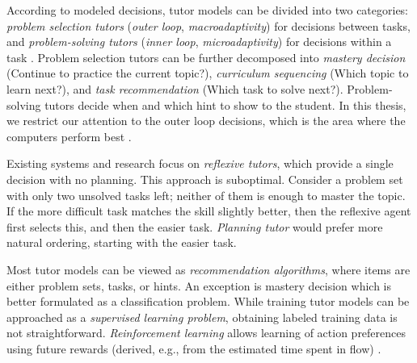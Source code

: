 According to modeled decisions, tutor models can be divided into two categories:
\emph{problem selection tutors} (\emph{outer loop}, \emph{macroadaptivity})
for decisions between tasks, %
and \emph{problem-solving tutors} (\emph{inner loop}, \emph{microadaptivity})
for decisions within a task \cite{its-learner-models}. %
Problem selection tutors can be further decomposed %
into
\emph{mastery decision} (Continue to practice the current topic?),
\emph{curriculum sequencing} (Which topic to learn next?),
and \emph{task recommendation} (Which task to solve next?).
Problem-solving tutors decide when and which hint to show to the student.
In this thesis, we restrict our attention to the outer loop decisions,
which is the area where the computers perform best \cite{als-future}.

Existing systems and research focus on \emph{reflexive tutors}, which
provide a single decision with no planning. %
This approach is suboptimal. Consider a problem set with only two
unsolved tasks left; neither of them is enough to master the topic.
If the more difficult task matches the skill slightly better, then
the reflexive agent first selects this, and then the easier task.
\emph{Planning tutor} would prefer more natural ordering,
starting with the easier task.

Most tutor models can be viewed as \emph{recommendation algorithms}, %
where items are either problem sets, tasks, or hints.
An exception is mastery decision which is better formulated as a
classification problem.
While training tutor models can be approached as a \emph{supervised learning problem}, %
obtaining labeled training data is not straightforward.
\emph{Reinforcement learning}  \cite{rl}
allows learning of action preferences using future rewards
(derived, e.g., from the estimated time spent in flow)
\cite{rl-for-tutors-evaluation}.


